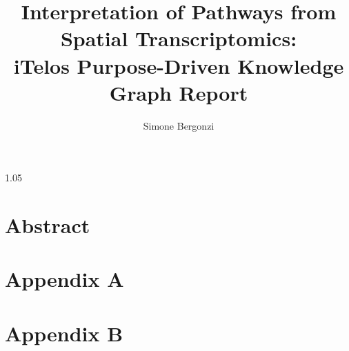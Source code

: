 \documentclass{knowdive}
\title{Interpretation of Pathways from Spatial Transcriptomics: \\ iTelos Purpose-Driven Knowledge Graph Report}
\author{Simone Bergonzi}
\begin{document}
\maketitle
\begin{sloppypar}
\large
\begin{spacing}{1.05}

\section*{Abstract}






%



% 

















\newpage
\appendix

\section{Appendix A}


\section{Appendix B}


\end{spacing}
\end{sloppypar}
\end{document}
